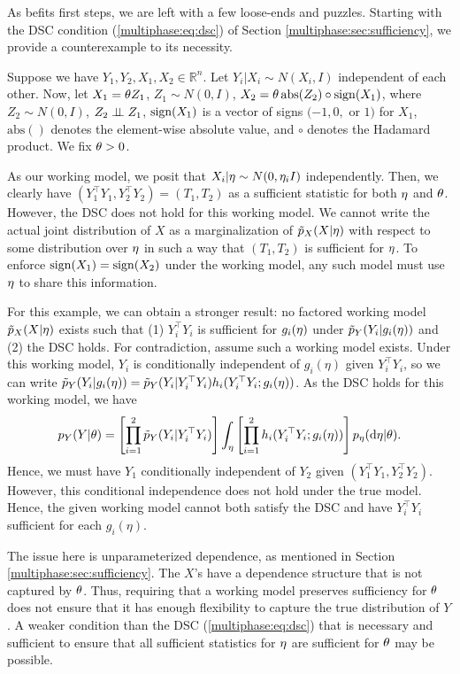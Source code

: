 As befits first steps, we are left with a few loose-ends and puzzles.
Starting with the DSC condition (\ref{multiphase:eq:dsc}) of Section \ref{multiphase:sec:sufficiency}, we provide a  counterexample to its necessity.

Suppose we have $Y_1,  Y_2,  X_1,  X_2 \in \mathbb{R}^n$. Let $ Y_i |  X_i \sim N(X_i, I)$ independent of each other.
Now, let $X_1 = \theta Z_1$, $Z_1 \sim N(0, I)$, $X_2 = \theta \, \mathrm{abs}(Z_2) \circ \operatorname{sign}(X_1)$, where $Z_2 \sim N(0, I)$, $Z_2 \perp\!\!\!\perp Z_1$, $\operatorname{sign}(X_1)$ is a vector of signs $(-1, 0,$ or $1)$ for $X_1$, $\mathrm{abs}()$ denotes the element-wise absolute value, and $\circ$ denotes the Hadamard product.
We fix $\theta > 0$.

As our working model, we posit that $X_i |\eta \sim N(0, \eta_i I)$ independently.
Then, we clearly have $(Y_1^\top Y_1, Y_2^\top Y_2) = (T_1, T_2)$ as a sufficient statistic for both $\eta$ and $\theta$.
However, the DSC does not hold for this working model.
We cannot write the actual joint distribution of $X$ as a marginalization of $\tilde{p}_X(X |\eta)$ with respect to some distribution over $\eta$ in such a way that $(T_1, T_2)$ is sufficient for $\eta$.
To enforce $\operatorname{sign}(X_1) = \operatorname{sign}(X_2)$ under the working model, any such model must use $\eta$ to share this information.

For this example, we can obtain a stronger result: no factored working model $\tilde{p}_X(X |\eta)$ exists such that (1) $Y_i^\top Y_i$ is sufficient for $g_i(\eta)$ under $\tilde{p}_Y(Y_i | g_i(\eta))$ and (2) the DSC holds.
For contradiction, assume such a working model exists.
Under this working model, $Y_i$ is conditionally independent of $g_i(\eta)$ given $Y_i^\top Y_i$, so we can write $\tilde{p}_Y(Y_i | g_i(\eta)) = \tilde{p}_Y(Y_i | Y_i^\top Y_i) h_i(Y_i^\top Y_i; g_i(\eta))$.
As the DSC holds for this working model, we have
$$p_Y(Y | \theta) = \left[ \prod_{i=1}^2 \tilde{p}_Y(Y_i | Y_i^\top Y_i) \right] \int_{\eta} \left[ \prod_{i=1}^2 h_i(Y_i^\top Y_i; g_i(\eta)) \right] p_\eta(\mathrm{d}\eta | \theta) .
$$
Hence, we must have $Y_1$ conditionally independent of $Y_2$ given $(Y_1^\top Y_1, Y_2^\top Y_2)$.
However, this conditional independence does not hold under the true model.
Hence, the given working model cannot both satisfy the DSC and have $Y_i^\top Y_i$ sufficient for each $g_i(\eta)$. 

The issue here is unparameterized dependence, as mentioned in Section \ref{multiphase:sec:sufficiency}.
The $X$'s have a dependence structure that is not captured by $\theta$.
Thus, requiring that a working model preserves sufficiency for $\theta$ does not ensure that it has enough flexibility to capture the true distribution of $Y$.
A weaker condition than the DSC (\ref{multiphase:eq:dsc}) that is necessary and sufficient to ensure that all sufficient statistics for $\eta$ are sufficient for $\theta$ may be possible.

